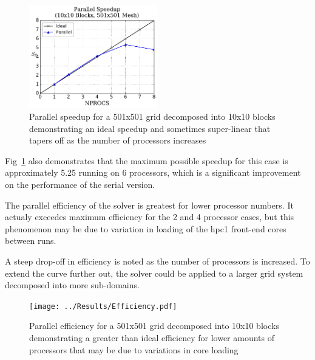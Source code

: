 \documentclass[twocolumn,10pt]{asme2ej}
\begin{document}
\begin{figure}[htb]
\begin{center}
\includegraphics[width=0.5\textwidth]{../Results/Speedup.pdf}
\caption{Parallel speedup for a 501x501 grid decomposed into 10x10 blocks demonstrating an ideal speedup and sometimes super-linear that tapers off as the number of processors increases}
\label{Speedup}
\end{center}
\end{figure}

Fig~\ref{Speedup} also demonstrates that the maximum possible speedup for this case is approximately 5.25 running on 6 processors, which is a significant improvement on the performance of the serial version.



The parallel efficiency of the solver is greatest for lower processor numbers.  It actualy exceedes maximum efficiency for the 2 and 4 processor cases, but this phenomenon may be due to variation in loading of the hpc1 front-end cores between runs.



A steep drop-off in efficiency is noted as the number of processors is increased.  To extend the curve further out, the solver could be applied to a larger grid system decomposed into more sub-domains.

\begin{figure}[htb]
\begin{center}
\texttt{[image: ../Results/Efficiency.pdf]}
\caption{Parallel efficiency for a 501x501 grid decomposed into 10x10 blocks demonstrating a greater than ideal efficiency for lower amounts of processors that may be due to variations in core loading}
\label{Effish}
\end{center}
\end{figure}
\end{document}
